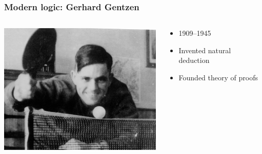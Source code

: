 \begin{frame}
  \frametitle{Modern logic: Gerhard Gentzen}

  \begin{columns}
    \begin{column}{.5\textwidth}
      \includegraphics[width=\textwidth]{../assets/gentzen}
    \end{column}
    \begin{column}{.5\textwidth}
      \begin{itemize}[<+->]
        \item 1909--1945
        \item Invented natural deduction
        \item Founded theory of proofs
      \end{itemize}
    \end{column}
  \end{columns}
\end{frame}

